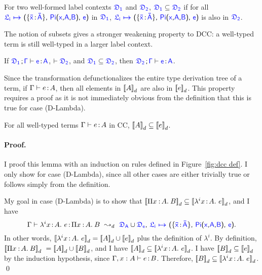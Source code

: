 \begin{definition} For two well-formed label contexts $\target{\fdef_1}$ and $\target{\fdef_2}$, $\target{\fdef_1} \subseteq \target{\fdef_2}$ if for all $\itemdef{\target{\flabel_i}}{\itemtype{\bar{x}}{\bar{A}}}{\targetpi{x}{A}{B}}{\target{e}}$ in $\target{\fdef_1}$, $\itemdef{\target{\flabel_i}}{\itemtype{\bar{x}}{\bar{A}}}{\targetpi{x}{A}{B}}{\target{e}}$ is also in $\target{\fdef_2}$.
\end{definition}

The notion of subsets gives a stronger weakening property to DCC: a well-typed term is still well-typed in a larger label context.

\begin{lemma} If $\target{\fdef_1} \semicolon \target{\Gamma} \vdash \itemtype{e}{A}$, $\vdash \target{\fdef_2}$, and $\target{\fdef_1} \subseteq \target{\fdef_2}$,
then $\target{\fdef_2} \semicolon \target{\Gamma} \vdash \itemtype{e}{A}$.
\end{lemma}

Since the transformation defunctionalizes the entire type derivation tree of a term, if $\Gamma \vdash e \hspace{0.5mm}{:}\hspace{0.5mm} A$, then all elements in ${[\![ A ]\!]}_d$ are also in ${[\![ e ]\!]}_d$. This property requires a proof as it is not immediately obvious from the definition that this is true for case (D-Lambda).

\begin{lemma} For all well-typed terms $\Gamma \vdash e \hspace{0.5mm}{:}\hspace{0.5mm} A$ in CC, ${[\![ A ]\!]}_d \subseteq {[\![ e ]\!]}_d$.
\label{lem:subset}
\end{lemma}
\paragraph{Proof.} I proof this lemma with an induction on rules defined in Figure~\ref{fig:dcc def}. 
I only show for case (D-Lambda), since all other cases are either trivially true or follows simply from the definition.

My goal in case (D-Lambda) is to show that ${[\![ \Pi x\mkern1.5mu{\hspace{0.5mm}{:}\hspace{0.5mm}} A.\hspace{0.8mm}B ]\!]}_d \subseteq {[\![ \lambda^{i}x\hspace{0.5mm}{:}\hspace{0.5mm}A.\ e ]\!]}_d$, and I have
\begin{equation*}
\Gamma \vdash \lami{i}{x}{A}{e} \goodcolon \pitype{x}{A}{B}\ \leadsto_d\ \target{\fdef_A} \cup \target{\fdef_e} \sfcomma \itemdef{\target{\flabel_i}}{\itemtype{\bar{x}}{\bar{A}}}{\targetpi{x}{A}{B}}{\target{e}}.
\end{equation*}
In other words, ${[\![ \lambda^{i}x\hspace{0.5mm}{:}\hspace{0.5mm} A.\ e ]\!]}_d = {[\![ A ]\!]}_d \cup {[\![ e ]\!]}_d$ plus the definition of $\lambda^i$. By definition, $\bbracket{\pitype{x}{A}{B}}_d\ = \bbracket{A}_d \cup \bbracket{B}_d$, and I have ${[\![ A ]\!]}_d \subseteq {[\![ \lambda^{i}x\hspace{0.5mm}{:}\hspace{0.5mm}A.\ e ]\!]}_d$. 
I have ${[\![ B ]\!]}_d \subseteq {[\![ e ]\!]}_d$ by the induction hypothesis, since $\Gamma, x:A \vdash e \hspace{0.5mm}{:}\hspace{0.5mm} B$. Therefore, ${[\![ B ]\!]}_d \subseteq {[\![ \lambda^{i}x\hspace{0.5mm}{:}\hspace{0.5mm}A.\ e ]\!]}_d$. \qed

